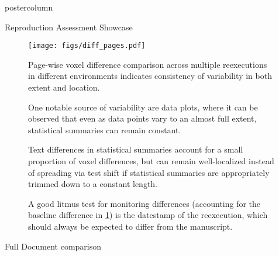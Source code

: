 \begin{frame}
\begin{columns}
\begin{column}{.59\textwidth}
\begin{beamercolorbox}[center]{postercolumn}
\begin{minipage}{.98\textwidth}
{\begin{myblock}{Reproduction Assessment Showcase}
						\begin{minipage}{.56\textwidth}
						\begin{figure}
							\texttt{[image: figs/diff\_pages.pdf]}
							\vspace{0.2em}
							\caption{
								Page-wise voxel difference comparison across multiple reexecutions in different environments indicates consistency of variability in both extent and location.
							}
							\label{fig:ras_s}
						\end{figure}
						\begin{figure}
							\vspace{0.2em}
							\caption{
								One notable source of variability are data plots, where it can be observed that even as data points vary to an almost full extent, statistical summaries can remain constant.
							}
						\end{figure}
						\end{minipage}
						\hfill
						\begin{minipage}{.38\textwidth}
						\vspace{1.1em}
						\begin{figure}
							\vspace{0.2em}
							\caption{
								Text differences in statistical summaries account for a small proportion of voxel differences, but can remain well-localized instead of spreading via test shift if statistical summaries are appropriately trimmed down to a constant length.
							}
						\end{figure}
						\begin{figure}
							\vspace{0.2em}
							\caption{
								A good litmus test for monitoring differences (accounting for the baseline difference in \cref{fig:ras_s}) is the datestamp of the reexecution, which should always be expected to differ from the manuscript.
							}
						\end{figure}
						\end{minipage}
					\end{myblock}\vfill
					\begin{myblock}{Full Document comparison}
						\vspace{0.75em}

\end{myblock}}
\end{minipage}
\end{beamercolorbox}
\end{column}
\end{columns}
\end{frame}
